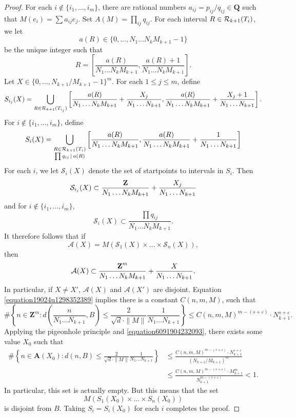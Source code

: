 \begin{proof}
    For each $i \not \in \{ i_1, \dots, i_m \}$, there are rational numbers $a_{ij} = p_{ij}/q_{ij} \in \mathbf{Q}$ such that $M(e_i) = \sum a_{ij} e_j$. Set $A(M) = \prod_{ij} q_{ij}$. For each interval $R \in \operatorname{\mathcal{R}}_{k+1}(T_i)$, we let
    \[ a(R) \in \{ 0, \dots, N_1 \dots N_k M_{k+1} - 1 \} \]
    be the unique integer such that
    \[ R = \left[ \frac{a(R)}{N_1 \dots N_k M_{k+1}}, \frac{a(R) + 1}{N_1 \dots N_k M_{k+1}} \right]. \]
    Let $X \in \{ 0, \dots, N_{k+1}/M_{k+1} - 1 \}^m$. For each $1 \leq j \leq m$, define
    \[ S_{i_j}(X) = \bigcup_{R \in \operatorname{\mathcal{R}}_{k+1}(T_{i_j})} \left[ \frac{a(R)}{N_1 \dots N_k M_{k+1}} + \frac{X_j}{N_1 \dots N_{k+1}}, \frac{a(R)}{N_1 \dots N_k M_{k+1}} + \frac{X_j + 1}{N_1 \dots N_{k+1}} \right]. \]
    For $i \not \in \{ i_1, \dots, i_m \}$, define
    \[ S_i(X) = \bigcup_{\substack{R \in \operatorname{\mathcal{R}}_{k+1}(T_i)\\ \prod q_{ij} \operatorname{\mid} a(R)}} \left[ \frac{a(R)}{N_1 \dots N_k M_{k+1}}, \frac{a(R)}{N_1 \dots N_k M_{k+1}} + \frac{1}{N_1 \dots N_{k+1}} \right] \]
    For each $i$, we let $\mathcal{S}_i(X)$ denote the set of startpoints to intervals in $S_i$. Then
    \[ \mathcal{S}_{i_j}(X) \subset \frac{\operatorname{\mathbf{Z}}}{N_1 \dots N_k M_{k+1}} + \frac{X_j}{N_1 \dots N_{k+1}} \]
    and for $i \not \in \{ i_1, \dots, i_m \}$,
    \[ \mathcal{S}_i(X) \subset \frac{\prod q_{ij}}{N_1 \dots N_k M_{k+1}}. \]
    It therefore follows that if
    \[ \mathcal{A}(X) = M(\mathcal{S}_1(X) \times \dots \times \mathcal{S}_n(X)), \]
    then
    \[ \mathcal{A}(X) \subset \frac{\operatorname{\mathbf{Z}}^m}{N_1 \dots N_k M_{k+1}} + \frac{X}{N_1 \dots N_{k+1}}. \]
    In particular, if $X \neq X'$, $\mathcal{A}(X)$ and $\mathcal{A}(X')$ are disjoint. Equation \eqref{equation19024u1298352389} implies there is a constant $C(n,m,M)$, such that
    \[ \# \left\{ n \in \mathbf{Z}^m : d \left( \frac{n}{N_1 \dots N_{k+1}}, B \right) \leq \frac{2}{\sqrt{d} \cdot \| M \|} \frac{1}{N_1 \dots N_{k+1}} \right\} \leq C(n,m,M)^{m - (s + \varepsilon)} \cdot N_{k+1}^{s + \varepsilon}. \]
    Applying the pigeonhole principle and \eqref{equation6091904232093}, there exists some value $X_0$ such that
    \begin{align*}
        \# \left\{ n \in \mathbf{A}(X_0) : d(n,B) \leq \frac{2}{\sqrt{d} \cdot \| M \|} \frac{1}{N_1 \dots N_{k+1}} \right\} &\leq \frac{C(n,m,M)^{m - (s + \varepsilon)} \cdot N_{k+1}^{s + \varepsilon}}{(N_{k+1}/M_{k+1})^m}\\
        &\leq \frac{C(n,m,M)^{m - (s + \varepsilon)} \cdot M_{k+1}^m}{N_{k+1}^{m - (s + \varepsilon)}} < 1.
    \end{align*}
    In particular, this set is actually empty. But this means that the set
    \[ M(S_1(X_0) \times \dots \times S_n(X_0)) \]
    is disjoint from $B$. Taking $S_i = S_i(X_0)$ for each $i$ completes the proof.
\end{proof}

